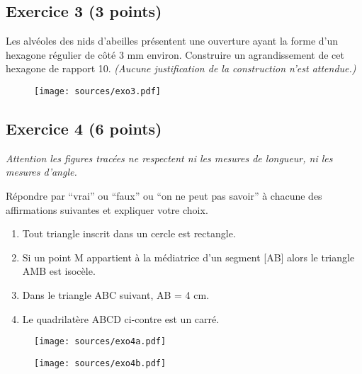 \documentclass[12pt]{article}
\begin{document}
\subsection*{Exercice 3 (3 points)}

\begin{multicols}{2}
  
Les alvéoles des nids d’abeilles présentent une ouverture ayant la forme d’un hexagone régulier de côté 3 mm environ.
Construire un agrandissement de cet hexagone de rapport 10. \textit{(Aucune justification de la construction n’est attendue.)}

\begin{figure}[H]
  \centering
  \texttt{[image: sources/exo3.pdf]}
\end{figure}

\end{multicols}

\newpage

\subsection*{Exercice 4 (6 points)}

\begin{multicols}{2}

\textit{Attention les figures tracées ne respectent ni les mesures de longueur, ni les mesures d’angle.} \newline

Répondre par ``vrai'' ou ``faux'' ou ``on ne peut pas savoir'' à chacune des affirmations suivantes et expliquer votre choix.
  
\begin{enumerate}
\item Tout triangle inscrit dans un cercle est rectangle.
\item Si un point M appartient à la médiatrice d’un segment [AB] alors le triangle AMB est isocèle.
\item Dans le triangle ABC suivant, AB = 4 cm.
\item Le quadrilatère ABCD ci-contre est un carré.
\end{enumerate}

\begin{figure}[H]
  \centering
  \texttt{[image: sources/exo4a.pdf]}
\end{figure}

\begin{figure}[H]
  \centering
  \texttt{[image: sources/exo4b.pdf]}
\end{figure}

\end{multicols}
\end{document}
